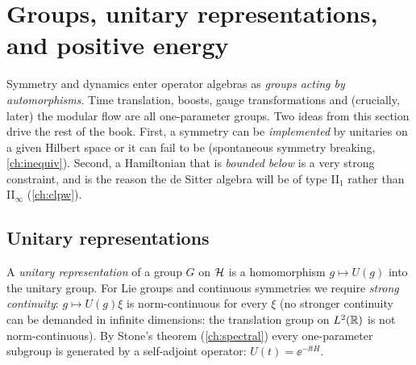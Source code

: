 \section{Groups, unitary representations, and positive energy}\label{ch:groups}

\begin{physmotiv}
Symmetry and dynamics enter operator algebras as \emph{groups acting by automorphisms}. Time translation, boosts, gauge transformations and (crucially, later) the modular flow are all one-parameter groups. Two ideas from this section drive the rest of the book. First, a symmetry can be \emph{implemented} by unitaries on a given Hilbert space or it can fail to be (spontaneous symmetry breaking, \cref{ch:inequiv}). Second, a Hamiltonian that is \emph{bounded below} is a very strong constraint, and is the reason the de Sitter algebra will be of type II$_1$ rather than II$_\infty$ (\cref{ch:clpw}).
\end{physmotiv}

\subsection{Unitary representations}

A \emph{unitary representation} of a group $G$ on $\mathcal{H}$ is a homomorphism $g\mapsto U(g)$ into the unitary group. For Lie groups and continuous symmetries we require \emph{strong continuity}: $g\mapsto U(g)\xi$ is norm-continuous for every $\xi$ (no stronger continuity can be demanded in infinite dimensions: the translation group on $L^2(\mathbb{R})$ is not norm-continuous). By Stone's theorem (\cref{ch:spectral}) every one-parameter subgroup is generated by a self-adjoint operator: $U(t)=\ee^{-\ii tH}$.

\begin{center}
\renewcommand{\arraystretch}{1.25}
\end{center}

